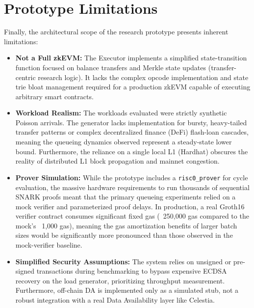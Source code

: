 \section{Prototype Limitations}
\label{sec:prototype_limitations}
Finally, the architectural scope of the research prototype presents inherent limitations:
\begin{itemize}
    \item \textbf{Not a Full zkEVM:} The Executor implements a simplified state-transition function focused on balance transfers and Merkle state updates (transfer-centric research logic). It lacks the complex opcode implementation and state trie bloat management required for a production zkEVM capable of executing arbitrary smart contracts.
    \item \textbf{Workload Realism:} The workloads evaluated were strictly synthetic Poisson arrivals. The generator lacks implementation for bursty, heavy-tailed transfer patterns or complex decentralized finance (DeFi) flash-loan cascades, meaning the queueing dynamics observed represent a steady-state lower bound. Furthermore, the reliance on a single local L1 (Hardhat) obscures the reality of distributed L1 block propagation and mainnet congestion.
    \item \textbf{Prover Simulation:} While the prototype includes a \texttt{risc0\_prover} for cycle evaluation, the massive hardware requirements to run thousands of sequential SNARK proofs meant that the primary queueing experiments relied on a mock verifier and parameterized proof delays. In production, a real Groth16 verifier contract consumes significant fixed gas (~250,000 gas compared to the mock's ~1,000 gas), meaning the gas amortization benefits of larger batch sizes would be significantly more pronounced than those observed in the mock-verifier baseline.
    \item \textbf{Simplified Security Assumptions:} The system relies on unsigned or pre-signed transactions during benchmarking to bypass expensive ECDSA recovery on the load generator, prioritizing throughput measurement. Furthermore, off-chain DA is implemented only as a simulated stub, not a robust integration with a real Data Availability layer like Celestia.
\end{itemize}
